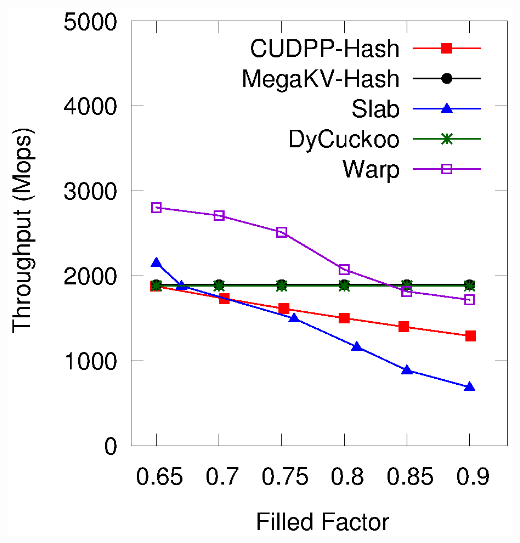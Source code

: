 \begin{minipage}{\textwidth}
\begin{minipage}[b]{0.49\textwidth}
\begin{minipage}{0.49\linewidth}
			\includegraphics[width=\textwidth]{../pic/static-load_factor/reddit/search.eps}
			\centerline{}
		\end{minipage}
	\end{minipage}
\end{minipage}

